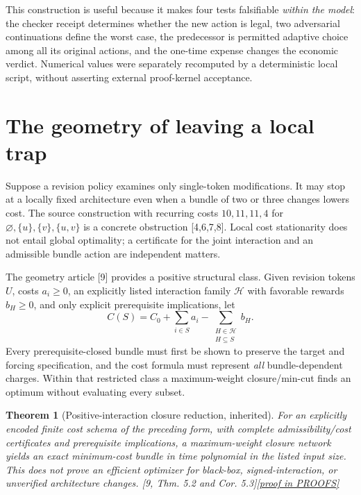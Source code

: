 \documentclass[11pt,letterpaper]{article}
\newtheorem{theorem}{Theorem}[section]
\theoremstyle{definition}
\theoremstyle{remark}
\newcommand{\prooflink}[1]{\hfill\hyperlink{proof:#1}{\footnotesize[proof in PROOFS]}}
\newcommand{\src}[1]{\textup{[#1]}}
\begin{document}
This construction is useful because it makes four tests falsifiable \emph{within the model}: the checker receipt determines whether the new action is legal, two adversarial continuations define the worst case, the predecessor is permitted adaptive choice among all its original actions, and the one-time expense changes the economic verdict. Numerical values were separately recomputed by a deterministic local script, without asserting external proof-kernel acceptance.

\section{The geometry of leaving a local trap}
Suppose a revision policy examines only single-token modifications. It may stop at a locally fixed architecture even when a bundle of two or three changes lowers cost. The source construction with recurring costs $10,11,11,4$ for $\varnothing,\{u\},\{v\},\{u,v\}$ is a concrete obstruction \src{4,6,7,8}. Local cost stationarity does not entail global optimality; a certificate for the joint interaction and an admissible bundle action are independent matters.

The geometry article \src{9} provides a positive structural class. Given revision tokens $U$, costs $a_i\geq0$, an explicitly listed interaction family $\mathcal H$ with favorable rewards $b_H\geq0$, and only explicit prerequisite implications, let
\[
 C(S)=C_0+\sum_{i\in S}a_i-\sum_{\substack{H\in\mathcal H\\H\subseteq S}}b_H.
\]
Every prerequisite-closed bundle must first be shown to preserve the target and forcing specification, and the cost formula must represent \emph{all} bundle-dependent charges. Within that restricted class a maximum-weight closure/min-cut finds an optimum without evaluating every subset.

\begin{theorem}[Positive-interaction closure reduction, inherited]\label{thm:closure}\hypertarget{claim:closure}{}
For an explicitly encoded finite cost schema of the preceding form, with complete admissibility/cost certificates and prerequisite implications, a maximum-weight closure network yields an exact minimum-cost bundle in time polynomial in the \emph{listed} input size. This does not prove an efficient optimizer for black-box, signed-interaction, or unverified architecture changes. \src{9, Thm. 5.2 and Cor. 5.3}\prooflink{closure}
\end{theorem}
\end{document}
